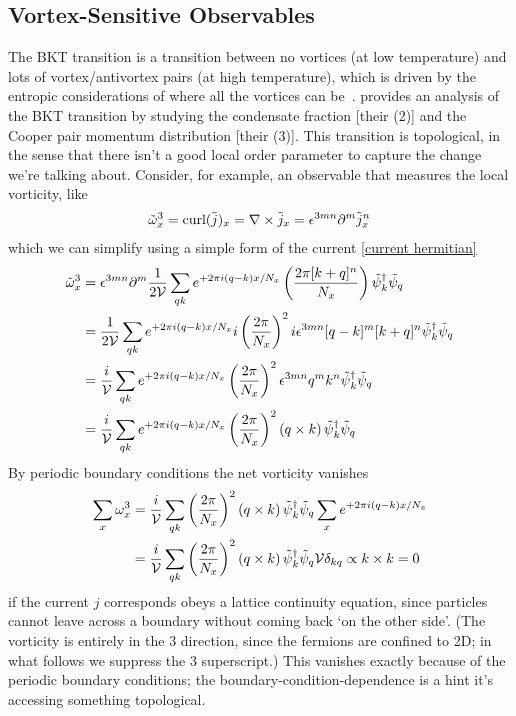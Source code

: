 \subsection{Vortex-Sensitive Observables}\label{sec:vortex}

The BKT transition is a transition between no vortices (at low temperature) and lots of vortex/antivortex pairs (at high temperature), which is driven by the entropic considerations of where all the vortices can be~\cite{1971JETP...32..493B,1972JETP...34..610B,Kosterlitz:1973}.
 provides an analysis of the BKT transition by studying the condensate fraction [their (2)] and the Cooper pair momentum distribution [their (3)].
This transition is topological, in the sense that there isn't a good local order parameter to capture the change we're talking about.
Consider, for example, an observable that measures the local vorticity, like
\begin{align}
	\tilde{\omega}^3_x = \text{curl}(\tilde{j})_x = \nabla \times \tilde{j}_x = \epsilon^{3mn} \partial^m \tilde{j}^n_x
\end{align}
which we can simplify using a simple form of the current \eqref{current hermitian}
\begin{align}
	\tilde{\omega}^3_x
	&=
	\epsilon^{3mn} \partial^m \frac{1}{2\mathcal{V}}
	\sum_{qk} e^{+2\pi i (q-k) x / N_x} \left(\frac{2\pi [ k+q ]^n}{N_x}\right)
	\tilde{\psi}{}^{\dagger}_{k} \tilde{\psi}_{q}
	\nonumber\\
	&=
	\frac{1}{2\mathcal{V}}
	\sum_{qk} e^{+2\pi i (q-k) x / N_x} i \left(\frac{2\pi}{N_x}\right)^2 i \epsilon^{3mn} [q-k]^m[ k+q ]^n
	\tilde{\psi}{}^{\dagger}_{k} \tilde{\psi}_{q}
	\nonumber\\
	&=
	\frac{i}{\mathcal{V}}
	\sum_{qk} e^{+2\pi i (q-k) x / N_x} \left(\frac{2\pi}{N_x}\right)^2 \epsilon^{3mn} q^m k^n
	\tilde{\psi}{}^{\dagger}_{k} \tilde{\psi}_{q}
	\nonumber\\
	&=
	\frac{i}{\mathcal{V}}
	\sum_{qk} e^{+2\pi i (q-k) x / N_x} \left(\frac{2\pi}{N_x}\right)^2 (q \times k)\,
	\tilde{\psi}{}^{\dagger}_{k} \tilde{\psi}_{q}
	\label{eq:vorticity}
\end{align}
By periodic boundary conditions the net vorticity vanishes
\begin{align}
	\sum_x \omega^3_x 
	&=
	\frac{i}{\mathcal{V}}
	\sum_{qk} \left(\frac{2\pi}{N_x}\right)^2
	(q \times k)\,
	\tilde{\psi}{}^{\dagger}_{k} \tilde{\psi}_{q}
	\sum_x e^{+2\pi i (q-k) x / N_x}
	\nonumber\\
	&=
	\frac{i}{\mathcal{V}}
	\sum_{qk} \left(\frac{2\pi}{N_x}\right)^2
	(q \times k)\,
	\tilde{\psi}{}^{\dagger}_{k} \tilde{\psi}_{q}
	\mathcal{V} \delta_{kq}
	\propto
	k \times k
	=
	0
	\label{eq:net vorticity}
\end{align}
if the current $j$ corresponds obeys a lattice continuity equation, since particles cannot leave across a boundary without coming back `on the other side'.
(The vorticity is entirely in the 3 direction, since the fermions are confined to 2D; in what follows we suppress the 3 superscript.)
This vanishes exactly because of the periodic boundary conditions; the boundary-condition-dependence is a hint it's accessing something topological.


